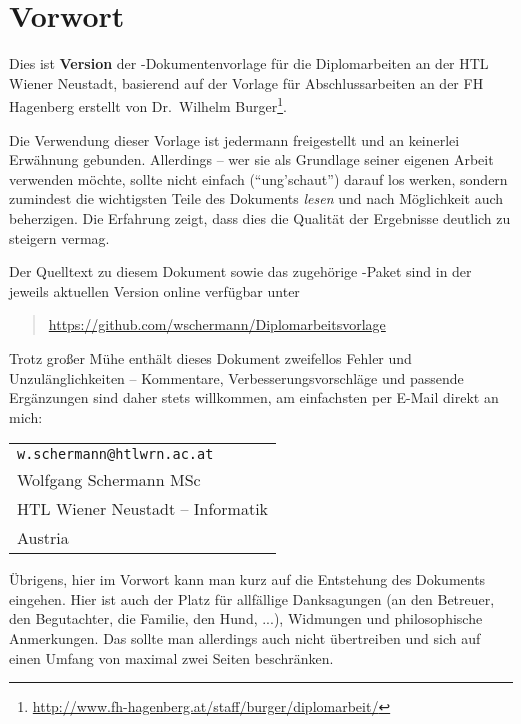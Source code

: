 \chapter{Vorwort}

Dies ist \textbf{Version \htldiplDate} der \latex-Dokumentenvorlage für 
die Diplomarbeiten an der HTL Wiener Neustadt, basierend auf der
Vorlage für Abschlussarbeiten an der FH Hagenberg erstellt von Dr.\ Wilhelm
Burger\footnote{\url{http://www.fh-hagenberg.at/staff/burger/diplomarbeit/}}.

Die Verwendung dieser Vorlage ist jedermann freigestellt und an
keinerlei Erwähnung gebunden. Allerdings -- wer sie als Grundlage
seiner eigenen Arbeit verwenden möchte, sollte nicht einfach
("`ung'schaut"') darauf los werken, sondern zumindest die
wichtigsten Teile des Dokuments \emph{lesen} und nach Möglichkeit
auch beherzigen. Die Erfahrung zeigt, dass dies die Qualität der
Ergebnisse deutlich zu steigern vermag.

Der Quelltext zu diesem Dokument sowie das zugehörige
\latex-Paket sind in der jeweils aktuellen Version online
verfügbar unter
%
\begin{quote}
\url{https://github.com/wschermann/Diplomarbeitsvorlage}
\end{quote}
%
Trotz großer Mühe enthält dieses Dokument zweifellos Fehler und Unzulänglichkeiten
-- Kommentare, Verbesserungsvorschläge und passende Ergänzungen
sind daher stets willkommen, am einfachsten per E-Mail direkt an mich:
\begin{center}%
\begin{tabular}{l}
\nolinkurl{w.schermann@htlwrn.ac.at} \\
Wolfgang Schermann MSc \\
HTL Wiener Neustadt -- Informatik\\
Austria
\end{tabular}
\end{center}

\noindent
Übrigens, hier im Vorwort kann man kurz auf die Entstehung  des Dokuments eingehen.
Hier ist auch der Platz für allfällige Danksagungen (\zB an den Betreuer, 
den Begutachter, die Familie, den Hund, ...), Widmungen und philosophische 
Anmerkungen. Das sollte man allerdings auch nicht übertreiben und sich auf 
einen Umfang von maximal zwei Seiten beschränken.





